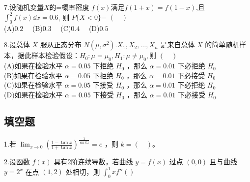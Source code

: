 7.设随机变量$X$的=概率密度 $f(x)$满足$f(1+x)=f(1-x)$,且 $\int_0^2 f(x)\dd{x}=0.6$, 则 $P\{X<0\}$= $(\quad)$\\
(A)$0.2 \quad$
(B)$0.3 \quad$
(C)$0.4 \quad$
(D)$0.5 \quad$


8.设总体 $X$ 服从正态分布 $N(\mu,\sigma^2).X_1,X_2,\dots,X_n$ 是来自总体 $X$ 的简单随机样本，据此样本检验假设：$H_0:\mu=\mu_0,H_1:\mu\neq \mu_0,$则 $(\quad)$\\
(A)如果在检验水平 $\alpha=0.05$ 下拒绝 $H_0$ ，那么 $\alpha=0.01$ 下必拒绝 $H_0$\\
(B)如果在检验水平 $\alpha=0.05$ 下拒绝 $H_0$ ，那么 $\alpha=0.01$ 下必接受 $H_0$\\
(C)如果在检验水平 $\alpha=0.05$ 下接受 $H_0$ ，那么 $\alpha=0.01$ 下必拒绝 $H_0$\\
(D)如果在检验水平 $\alpha=0.05$ 下接受 $H_0$ ，那么 $\alpha=0.01$ 下必接受 $H_0$

\subsection{填空题}
1.若 $\displaystyle \lim_{x \to  0} (\frac{1-\tan x}{1+\tan x})^\frac{1}{\sin kx}=e$ ，则 $k=(\quad)$。

2.设函数 $f(x)$ 具有2阶连续导数，若曲线 $y=f(x)$ 过点 $(0,0)$ 且与曲线 $y=2^x$ 在点 $(1,2)$ 处相切，则 $\int_0^1 xf''()$